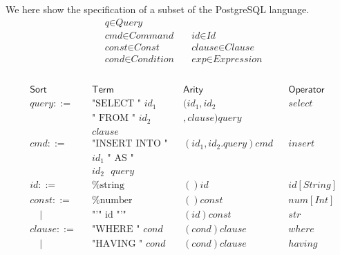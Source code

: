 \documentclass[sigplan]{acmart}
\begin{document}
\begin{example}\label{ex:as-sql-lang}
  We here show the specification of a subset of the PostgreSQL\cite{postgresql-about} language.
%
  \[
    \begin{aligned}
       & \textit{q} \in \textit{Query}                                                       \\
       & \textit{cmd} \in \textit{Command}      \quad & \textit{id} \in \textit{Id}          \\
       & \textit{const} \in \textit{Const}      \quad & \textit{clause} \in \textit{Clause}  \\
       & \textit{cond} \in \textit{Condition}   \quad & \textit{exp} \in \textit{Expression} \\
    \end{aligned}
  \]
  \\
  \[
    \begin{aligned}
       & \textsf{Sort} &  & \textsf{Term}                     &   & \textsf{Arity}            &  & \textsf{Operator} \\
       & query ::=   &  & \text{"SELECT " $id_1$}         &   & (id_1,id_2 &  & select          \\
        &             &  & \text{" FROM " $id_2$}         &   &  ,clause)query \\
        &             &  & \text{$clause$}                                                                       \\
       & cmd ::=     &  & \text{"INSERT INTO "}    &   & (id_1,id_2.query)cmd    &  & insert          \\
       &             &  & \text{$id_1$ " AS "}    &                                                  \\
       &             &  & \text{$id_2$ $query$}    &                                                  \\
       & id ::=      &  & \text{\%string}                 &   & ()id                    &  & id[String]      \\
       & const ::=   &  & \text{\%number}                 &   & ()const                 &  & num[Int]        \\
       & \quad |     &  & \text{"'" id "'"}               &   & (id)const               &  & str             \\
       & clause ::=  &  & \text{"WHERE " $cond$}          &   & (cond)clause            &  & where           \\
       & \quad |     &  & \text{"HAVING " $cond$}         &   & (cond)clause            &  & having          \\

\end{aligned}\]
\end{example}
\end{document}
